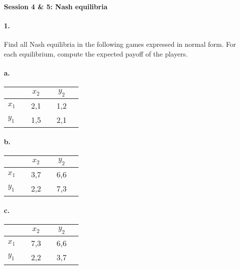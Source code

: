 \documentclass[a4paper,notitlepage,12pt]{article}
\begin{document}
\setlength{\parindent}{0pt}
\setlength{\parskip}{1ex plus 0.5ex minus 0.2ex}

\large

\textbf{Session 4 \& 5: Nash equilibria}


\paragraph{1. } Find all Nash equilibria in the following games expressed in normal form. For each equilibrium, compute the expected payoff of the players. 

	\paragraph{a. }	
	\vspace{-.5cm}
	\begin{center}
		\begin{tabular}[h!]{l|ccccc}
			&& \Large{$x_2$} && \Large{$y_2$} & \\
			\hline
			\Large{$x_1$} && \Large{2,1} && \Large{1,2} & \\
			\Large{$y_1$} && \Large{1,5} && \Large{2,1} & 
		\end{tabular} 
	\end{center}
	\paragraph{b. }
	\vspace{-.5cm}
	\begin{center}
		\begin{tabular}[h!]{l|ccccc}
			&& \Large{$x_2$} && \Large{$y_2$} & \\
			\hline
			\Large{$x_1$} && \Large{3,7} && \Large{6,6} & \\
			\Large{$y_1$} && \Large{2,2} && \Large{7,3} & 
		\end{tabular} 
	\end{center}
	\paragraph{c. }
	\vspace{-.5cm}
	\begin{center}
		\begin{tabular}[h!]{l|ccccc}
			&& \Large{$x_2$} && \Large{$y_2$} & \\
			\hline
			\Large{$x_1$} && \Large{7,3} && \Large{6,6} & \\
			\Large{$y_1$} && \Large{2,2} && \Large{3,7} & 
		\end{tabular} 
	\end{center}
\end{document}
